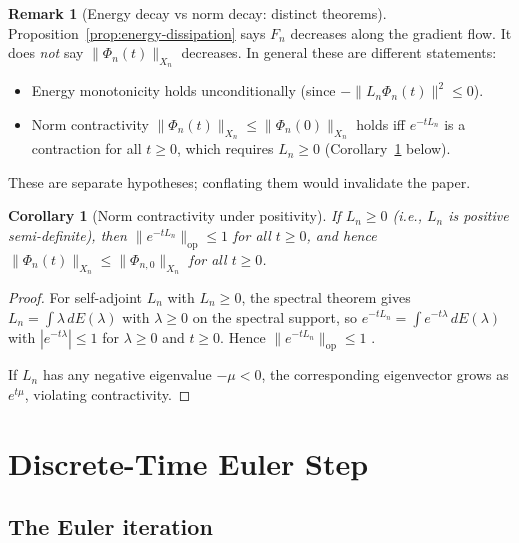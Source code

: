 \documentclass[11pt, a4paper]{amsart}
\newtheorem{corollary}[theorem]{Corollary}
\theoremstyle{definition}
\newtheorem{remark}[theorem]{Remark}
\newcommand{\op}{\operatorname{op}}
\begin{document}
\begin{remark}[Energy decay vs norm decay: distinct theorems]
\label{rmk:energy-vs-norm}
Proposition~\ref{prop:energy-dissipation} says $F_n$ decreases
along the gradient flow. It does \emph{not} say $\|\Phi_n(t)\|_{X_n}$
decreases. In general these are different statements:
\begin{itemize}
\item Energy monotonicity holds unconditionally (since
  $-\|L_n \Phi_n(t)\|^2 \leq 0$).
\item Norm contractivity $\|\Phi_n(t)\|_{X_n} \leq \|\Phi_n(0)
  \|_{X_n}$ holds iff $e^{-t L_n}$ is a contraction for all $t
  \geq 0$, which requires $L_n \geq 0$
  (Corollary~\ref{cor:norm-decay} below).
\end{itemize}
These are separate hypotheses; conflating them would invalidate
the paper.
\end{remark}

\begin{corollary}[Norm contractivity under positivity]
\label{cor:norm-decay}
If $L_n \geq 0$ (i.e., $L_n$ is positive semi-definite), then
$\|e^{-t L_n}\|_{\op} \leq 1$ for all $t \geq 0$, and hence
$\|\Phi_n(t)\|_{X_n} \leq \|\Phi_{n, 0}\|_{X_n}$ for all $t \geq
0$.
\end{corollary}

\begin{proof}
For self-adjoint $L_n$ with $L_n \geq 0$, the spectral theorem
gives $L_n = \int \lambda \, dE(\lambda)$ with
$\lambda \geq 0$ on the spectral support, so $e^{-t L_n} = \int
e^{-t\lambda} \, dE(\lambda)$ with $|e^{-t\lambda}| \leq 1$ for
$\lambda \geq 0$ and $t \geq 0$. Hence $\|e^{-t L_n}\|_{\op} \leq 1$
\cite[Thm.~VIII.5]{ReedSimonI}.

If $L_n$ has any negative eigenvalue $-\mu < 0$, the corresponding
eigenvector grows as $e^{t\mu}$, violating contractivity.
\end{proof}

\section{Discrete-Time Euler Step}
\label{sec:discrete-time}

\subsection{The Euler iteration}
\end{document}
